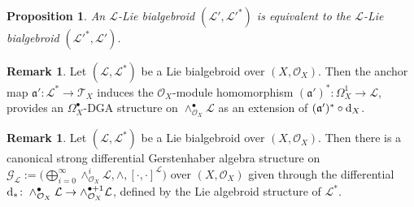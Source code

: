 \documentclass[pdftex]{sigma}
\numberwithin{equation}{section}
\newtheorem{Prop}[Thm]{Proposition}
\theoremstyle{definition}
\newtheorem{Rem}[Thm]{Remark}
\begin{document}
\begin{Prop}
	An $\mathcal{L}$-Lie bialgebroid $(\mathcal{L'}, \mathcal{L'}^*)$ is equivalent to the $\mathcal{L}$-Lie bialgebroid $(\mathcal{L'}^*, \mathcal{L'})$.
\end{Prop}
\begin{Rem}Let $(\mathcal{L}, \mathcal{L}^*)$ be a Lie bialgebroid over $(X,\mathcal{O}_X)$. Then the anchor map $\mathfrak{a}'\colon \mathcal{L}^* \rightarrow \mathcal{T}_X$ induces the $\mathcal{O}_X$-module homomorphism $(\mathfrak{a}')^*\colon \Omega^1_X \rightarrow \mathcal{L}$, provides an $\Omega^\bullet_X$-DGA structure on $\wedge^\bullet_{\mathcal{O}_X} \mathcal{L}$ as an extension of $(\mathfrak{a}')^* \circ {\rm d}_X$.
\end{Rem}

\begin{Rem}Let $(\mathcal{L}, \mathcal{L}^*)$ be a Lie bialgebroid over $(X, \mathcal{O}_X)$. Then there is a canonical strong differential Gerstenhaber algebra structure on $\mathcal{G}_{\mathcal{L}}:=\bigl(\bigoplus^{\infty}_{i=0}\wedge_{\mathcal{O}_X}^i \mathcal{L}, \wedge, [\cdot,\cdot]^{\mathcal{L}}\bigr)$ over $(X, \mathcal{O}_X)$ given through the differential ${\rm d}_*\colon \wedge^\bullet_{\mathcal{O}_X}\mathcal{L} \rightarrow \wedge^{\bullet+1}_{\mathcal{O}_X}\mathcal{L}$, defined by the Lie algebroid structure of $\mathcal{L}^*$.
\end{Rem}
\end{document}
